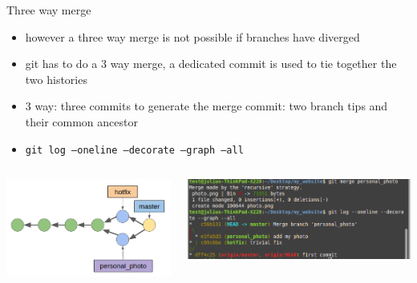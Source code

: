 \documentclass[12pt]{beamer}
\begin{document}
\begin{frame}{Three way merge}
\begin{itemize}
	\item however a three way merge is not possible if branches have diverged
	\item git has to do a 3 way merge, a dedicated commit is used to tie together the two histories
	\item 3 way: three commits to generate the merge commit: two branch tips and their common ancestor
	\item \texttt{git log --oneline --decorate --graph --all}
\end{itemize}
\begin{columns}
	\begin{column}{0.5\linewidth}
		\includegraphics[width=\linewidth]{three_way_merge}
	\end{column}
	\begin{column}{0.5\linewidth}
		\includegraphics[width=\linewidth]{merge_screenshot}
	\end{column}
\end{columns}
\end{frame}
\end{document}
